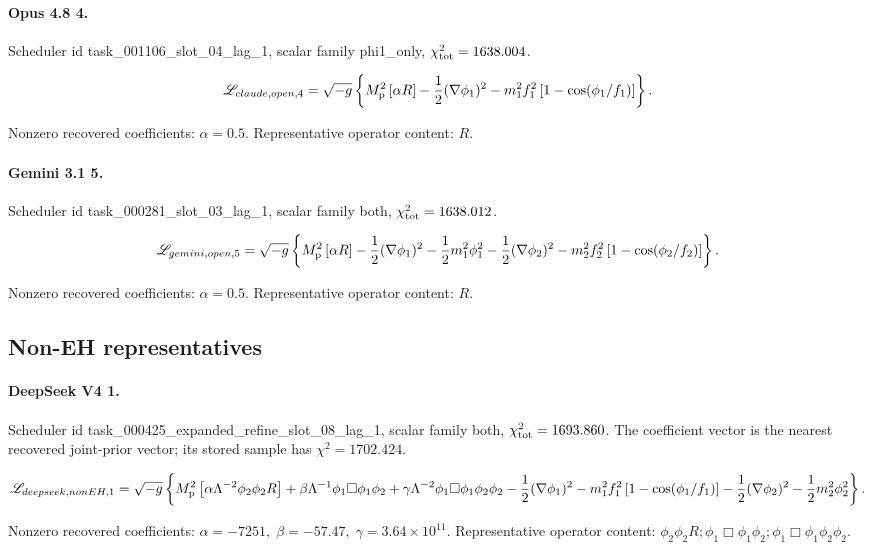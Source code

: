 \documentclass[aps,prd,twocolumn,superscriptaddress,nofootinbib,longbibliography]{revtex4-2}
\newcommand{\Mp}{M_{\rm p}}
\newcommand{\chiT}{\chi^2_{\rm tot}}
\begin{document}
\paragraph*{Opus 4.8 4.} Scheduler id task\_001106\_slot\_04\_lag\_1, scalar family phi1\_only, $\chiT=1638.004$.
\begin{widetext}
\begin{equation}
\mathscr{L}_{claude,open,4}=\sqrt{-g}\left\{\Mp^2\left[\alpha R\right] - \frac12(\nabla\phi_1)^2 - m_1^2f_1^2\left[1-\cos(\phi_1/f_1)\right]\right\}.
\end{equation}
\end{widetext}
\noindent Nonzero recovered coefficients: $\alpha=0.5$. Representative operator content: $R$.

\paragraph*{Gemini 3.1 5.} Scheduler id task\_000281\_slot\_03\_lag\_1, scalar family both, $\chiT=1638.012$.
\begin{widetext}
\begin{equation}
\mathscr{L}_{gemini,open,5}=\sqrt{-g}\left\{\Mp^2\left[\alpha R\right] - \frac12(\nabla\phi_1)^2 - \frac12m_1^2\phi_1^2 - \frac12(\nabla\phi_2)^2 - m_2^2f_2^2\left[1-\cos(\phi_2/f_2)\right]\right\}.
\end{equation}
\end{widetext}
\noindent Nonzero recovered coefficients: $\alpha=0.5$. Representative operator content: $R$.

\subsection{Non-EH representatives}

\paragraph*{DeepSeek V4 1.} Scheduler id task\_000425\_expanded\_refine\_slot\_08\_lag\_1, scalar family both, $\chiT=1693.860$. The coefficient vector is the nearest recovered joint-prior vector; its stored sample has $\chi^2=1702.424$.
\begin{widetext}
\begin{equation}
\mathscr{L}_{deepseek,nonEH,1}=\sqrt{-g}\left\{\Mp^2\left[\alpha \Lambda^{-2} \phi_2 \phi_2 R\right] + \beta \Lambda^{-1} \phi_1 \Box\phi_1 \phi_2 + \gamma \Lambda^{-2} \phi_1 \Box\phi_1 \phi_2 \phi_2 - \frac12(\nabla\phi_1)^2 - m_1^2f_1^2\left[1-\cos(\phi_1/f_1)\right] - \frac12(\nabla\phi_2)^2 - \frac12m_2^2\phi_2^2\right\}.
\end{equation}
\end{widetext}
\noindent Nonzero recovered coefficients: $\alpha=-7251,\; \beta=-57.47,\; \gamma=3.64\times 10^{11}$. Representative operator content: $\phi_2 \phi_2 R; \phi_1 \Box\phi_1 \phi_2; \phi_1 \Box\phi_1 \phi_2 \phi_2$.
\end{document}
